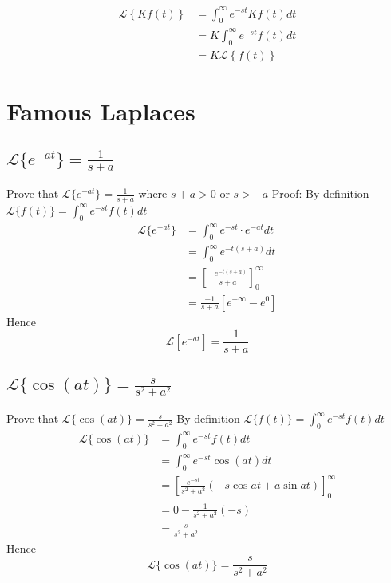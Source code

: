         
        \begin{align*}
            \displaystyle
            \mathcal{L}\left\{Kf(t)\right\}&=\int_{0}^{\infty}e^{-st}Kf(t)dt\\
            &=K\int_{0}^{\infty}e^{-st}f(t)dt\\
            &=K\mathcal{L}\left\{f(t)\right\}
        \end{align*}


    \section{Famous Laplaces}

        \subsection{\texorpdfstring{$\displaystyle \mathcal{L}\{e^{-at}\}=\frac{1}{s+a}$}{Lg}}
        Prove that $\mathcal{L}\{e^{-at}\}=\displaystyle \frac{1}{s+a}$
        where $s+a>0$ or $s>-a$
        Proof:
        By definition $\mathcal{L}\{f(t)\}=\displaystyle \int_{0}^{\infty}e^{-st}f(t)dt$
        \begin{align*}
            \mathcal{L}\{e^{-at}\} &= \int_{0}^{\infty}e^{-st}\cdot e^{-at}dt\\
            &=\int_{0}^{\infty}e^{-t(s+a)}dt\\
            &=\left[\frac{-e^{-t(s+a)}}{s+a} \right]_{0}^{\infty}\\
            &=\frac{-1}{s+a}\left[e^{-\infty}-e^{0}\right]
        \end{align*}
        Hence 
        \begin{equation}
            \mathcal{L}[e^{-at}]=\displaystyle \frac{1}{s+a}
        \end{equation}


        \subsection{\texorpdfstring{$\displaystyle \mathcal{L}\{\cos\left(at\right) \}=\frac{s}{s^2+a^2}$}{Lg}}
        Prove that $\displaystyle \mathcal{L}\{\cos\left(at\right)\}=\frac{s}{s^2+a^2}$
        By definition $\mathcal{L}\{f(t)\}=\displaystyle \int_{0}^{\infty}e^{-st}f(t)dt$
        \begin{align*}
            \mathcal{L}\{\cos\left(at\right) \} &= \displaystyle \int_{0}^{\infty}e^{-st}f(t)dt\\
            &=\int_{0}^{\infty}e^{-st}\cos\left(at\right) dt\\
            &=\left[\frac{e^{-st}}{s^{2}+a^{2}}(-s\cos at+a\sin at) \right]_{0}^{\infty}\\
            &=0-\frac{1}{s^{2}+a^{2}}(-s)\\
            &=\frac{s}{s^{2}+a^{2}}
        \end{align*}
        Hence 
        \begin{equation}
            \mathcal{L}\{\cos\left(at\right) \}=\frac{s}{s^{2}+a^{2}}
        \end{equation}
        

